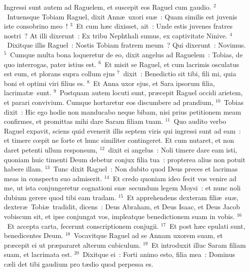 \lettrine[lines=10,image=true,loversize=0.05,lraise=-0.03]{I}{}ngressi sunt autem ad Raguelem, et suscepit eos Raguel cum gaudio.
${}^{2}$~Intuensque Tobiam Raguel, dixit Ann\ae\ uxori su\ae~: Quam similis est juvenis iste consobrino meo~!
${}^{3}$~Et cum h\ae c dixisset, ait~: Unde estis juvenes fratres nostri~? At illi dixerunt~: Ex tribu Nephthali sumus, ex captivitate Ninive.
${}^{4}$~Dixitque illis Raguel~: Nostis Tobiam fratrem meum~? Qui dixerunt~: Novimus.
${}^{5}$~Cumque multa bona loqueretur de eo, dixit angelus ad Raguelem~: Tobias, de quo interrogas, pater istius est.
${}^{6}$~Et misit se Raguel, et cum lacrimis osculatus est eum, et plorans supra collum ejus
${}^{7}$~dixit~: Benedictio sit tibi, fili mi, quia boni et optimi viri filius es.
${}^{8}$~Et Anna uxor ejus, et Sara ipsorum filia, lacrimat\ae\ sunt.
${}^{9}$~Postquam autem locuti sunt, pr\ae cepit Raguel occidi arietem, et parari convivium. Cumque hortaretur eos discumbere ad prandium,
${}^{10}$~Tobias dixit~: Hic ego hodie non manducabo neque bibam, nisi prius petitionem meam confirmes, et promittas mihi dare Saram filiam tuam.
${}^{11}$~Quo audito verbo Raguel expavit, sciens quid evenerit illis septem viris qui ingressi sunt ad eam~: et timere cœpit ne forte et hunc similiter contingeret. Et cum nutaret, et non daret petenti ullum responsum,
${}^{12}$~dixit ei angelus~: Noli timere dare eam isti, quoniam huic timenti Deum debetur conjux filia tua~: propterea alius non potuit habere illam.
${}^{13}$~Tunc dixit Raguel~: Non dubito quod Deus preces et lacrimas meas in conspectu suo admiserit.
${}^{14}$~Et credo quoniam ideo fecit vos venire ad me, ut ista conjungeretur cognationi su\ae\ secundum legem Moysi~: et nunc noli dubium gerere quod tibi eam tradam.
${}^{15}$~Et apprehendens dexteram fili\ae\ su\ae , dexter\ae\ Tobi\ae\ tradidit, dicens~: Deus Abraham, et Deus Isaac, et Deus Jacob vobiscum sit, et ipse conjungat vos, impleatque benedictionem suam in vobis.
${}^{16}$~Et accepta carta, fecerunt conscriptionem conjugii.
${}^{17}$~Et post h\ae c epulati sunt, benedicentes Deum.
${}^{18}$~Vocavitque Raguel ad se Annam uxorem suam, et pr\ae cepit ei ut pr\ae pararet alterum cubiculum.
${}^{19}$~Et introduxit illuc Saram filiam suam, et lacrimata est.
${}^{20}$~Dixitque ei~: Forti animo esto, filia mea~: Dominus c\ae li det tibi gaudium pro t\ae dio quod perpessa es.

